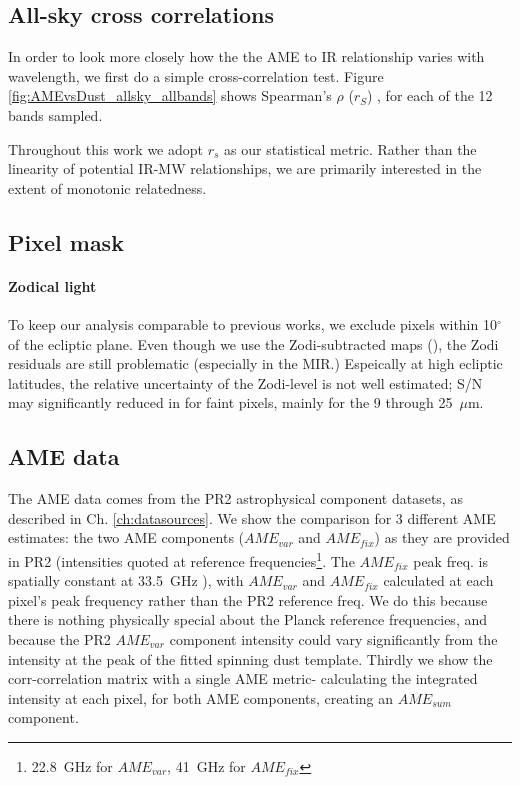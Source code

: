   \subsection{All-sky cross correlations}
  	In order to look more closely how the the AME to IR relationship varies with wavelength, we first do a simple cross-correlation test. Figure \ref{fig:AMEvsDust_allsky_allbands} shows Spearman's $\rho$ ($r_{S}$)
    , for each of the 12 bands sampled.{Throughout this work we adopt $r_{s}$ as our statistical metric. Rather than the linearity of potential IR-MW relationships, we are primarily interested in the extent of monotonic relatedness.

    \subsection{Pixel mask}
      \paragraph{Zodical light}
        To keep our analysis comparable to previous works, we exclude pixels within 10$^{\circ}$ of the ecliptic plane. Even though we use the Zodi-subtracted maps (\citep{kelsall98, kondo16}), the Zodi residuals are still problematic (especially in the MIR.) Espeically at high ecliptic latitudes, the relative uncertainty of the Zodi-level is not well estimated; S/N may significantly reduced in for faint pixels, mainly for the 9 through 25~$\mu$m.

    \subsection{AME data}
       The AME data comes from the PR2 astrophysical component datasets, as described in Ch. \ref{ch:datasources}. We show the comparison for 3 different AME estimates: the two AME components ($AME_{var}$ and $AME_{fix}$) as they are provided in PR2 (intensities quoted at reference frequencies\footnote{22.8~GHz for $AME_{var}$, 41~GHz for $AME_{fix}$}. The  $AME_{fix}$ peak freq. is spatially constant at 33.5~GHz ), with $AME_{var}$ and $AME_{fix}$ calculated at each pixel's peak frequency rather than the PR2 reference freq. We do this because there is nothing physically special about the Planck reference frequencies, and because the PR2 $AME_{var}$ component intensity could vary significantly from the intensity at the peak of the fitted spinning dust template. Thirdly we show the corr-correlation matrix with a single AME metric- calculating the integrated intensity at each pixel, for both AME components, creating an $AME_{sum}$ component.



}
